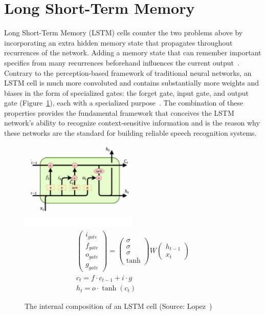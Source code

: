 \section{Long Short-Term Memory}

Long Short-Term Memory (LSTM) cells counter the two problems above by incorporating an extra hidden memory state that propagates throughout recurrences of the network. Adding a memory state that can remember important specifics from many recurrences beforehand influences the current output~\cite{brownlee_2021,koehn_2020}. Contrary to the perception-based framework of traditional neural networks, an LSTM cell is much more convoluted and contains substantially more weights and biases in the form of specialized gates: the forget gate, input gate, and output gate (Figure~\ref{fig:LSTMCell}), each with a specialized purpose~\cite{koehn_2020,lendave_2021}. The combination of these properties provides the fundamental framework that conceives the LSTM network’s ability to recognize context-sensitive information and is the reason why these networks are the standard for building reliable speech recognition systems. 

\begin{figure}[th]
    \centering
    \includegraphics[width=0.5\textwidth]{Figures/lstmarch.png}
    \begin{gather*}
    \begin{pmatrix}
        i_{gate} \\ f_{gate} \\ o_{gate} \\ g_{gate}
    \end{pmatrix}
    =
    \begin{pmatrix}
        \sigma \\ \sigma \\ \sigma \\ \tanh
    \end{pmatrix}
    W
    \begin{pmatrix}
        h_{t-1} \\ x_t
    \end{pmatrix}\\
    c_t = f \cdot c_{t-1} + i \cdot g\\
    h_t = o \cdot \tanh(c_t)
    \end{gather*}
    \decoRule
    \caption[LSTM Cell]{The internal composition of an LSTM cell (Source: Lopez~\cite{lopez_2019})}
    \label{fig:LSTMCell}
\end{figure}

